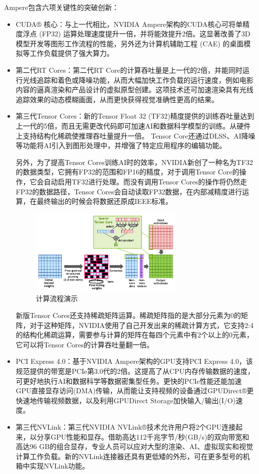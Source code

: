 \documentclass[a4paper]{article}
\begin{document}
Ampere包含六项关键性的突破创新：
\begin{itemize}
  \item CUDA® 核心：与上一代相比，NVIDIA Ampere架构的CUDA核心可将单精度浮点 (FP32) 运算处理速度提升一倍，并将能效提升2倍。这显著改善了3D模型开发等图形工作流程的性能，另外还为计算机辅助工程 (CAE) 的桌面模拟等工作负载提供了强大算力。
  \item 第二代RT Cores：第二代RT Core的计算吞吐量是上一代的2倍，并能同时运行光线追踪和着色或降噪功能，从而大幅加快工作负载的运行速度，例如电影内容的逼真渲染和产品设计的虚拟原型创建。这项技术还可加速渲染具有光线追踪效果的动态模糊画面，从而更快获得视觉准确性更高的结果。
  \item 第三代Tensor Cores：新的Tensor Float 32 (TF32)精度提供的训练吞吐量达到上一代的5倍，而且无需更改代码即可加速AI和数据科学模型的训练。从硬件上支持结构化稀疏使推理吞吐量提升一倍。 Tensor Core还通过DLSS、AI降噪等功能将AI引入到图形处理中，并增强了特定应用程序的编辑功能。
  
  另外，为了提高Tensor Cores训练AI时的效率，NVIDIA新创了一种名为TF32的数据类型，它拥有FP32的范围和FP16的精度，对于调用Tensor Core的操作，它会自动启用TF32进行处理。而没有调用Tensor Cores的操作将仍然走FP32的数据路径，Tensor Cores会自动读取FP32数据，在内部减精度进行运算，在最终输出的时候会将数据还原成IEEE标准。
  \begin{figure}[H] %
\centering %
\includegraphics[width=0.7\textwidth]{tensor} %
\caption{计算流程演示} %
\label{Fig.main2} %
\end{figure}

新版Tensor Cores还支持稀疏矩阵运算。稀疏矩阵指的是大部分元素为0的矩阵，对于这种矩阵，NVIDIA使用了自己开发出来的稀疏计算方式，它支持2:4的结构化稀疏运算，需要参与计算的矩阵在每四个元素中有2个以上的0元素，它可以将Tensor Cores的计算吞吐量翻一倍。
  \item PCI Express 4.0：基于NVIDIA Ampere架构的GPU支持PCI Express 4.0，该规范提供的带宽是PCIe第3.0代的2倍。这提高了从CPU内存传输数据的速度，可更好地执行AI和数据科学等数据密集型任务。更快的PCIe性能还能加速GPU直接显存访问(DMA)传输，从而能让支持视频的设备通过GPUDirect®更快速地传输视频数据，以及利用GPUDirect Storage加快输入/输出(I/O)速度。
  \item 第三代NVLink：第三代NVIDIA NVLink®技术允许用户将2个GPU连接起来，以分享GPU性能和显存。借助高达112千兆字节/秒(GB/s)的双向带宽和高达96 GB的组合显存，专业人员可以应对大型的渲染、AI、虚拟现实和视觉计算工作负载。新的NVLink连接器还具有更低矮的外形，可在更多型号的机箱中实现NVLink功能。
\end{itemize}
\end{document}

